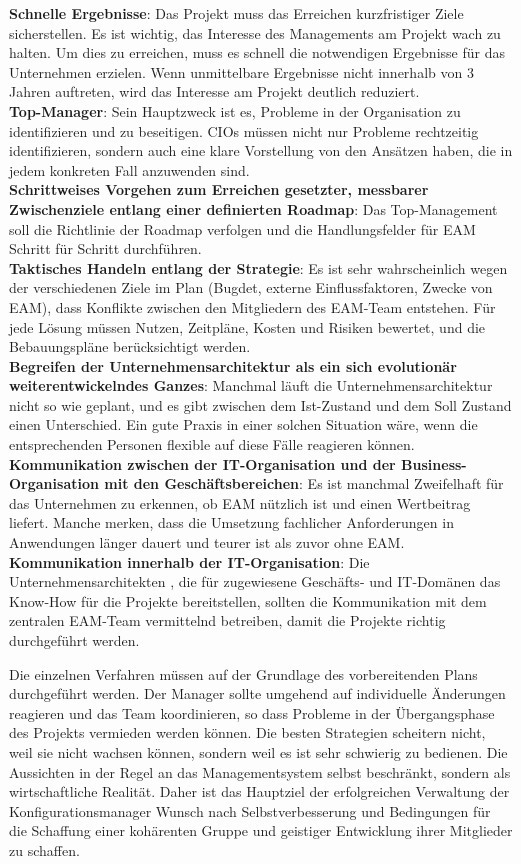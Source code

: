 \documentclass[
	A4paper,
	DIV=9,
	BCOR7mm,
	smallheadings,
	headinclude,
	footinclude,
	headsepline,
	parindent,
	german,
	captions=tableheading,
	abstracton
	]{scrreprt}
\begin{document}
\textbf{Schnelle Ergebnisse}: Das Projekt muss das Erreichen kurzfristiger Ziele sicherstellen. Es ist wichtig, das Interesse des Managements am Projekt wach zu halten. Um dies zu erreichen, muss es schnell die notwendigen Ergebnisse für das Unternehmen erzielen. Wenn unmittelbare Ergebnisse nicht innerhalb von 3 Jahren auftreten, wird das Interesse am Projekt deutlich reduziert.
\\
\textbf{Top-Manager}: Sein Hauptzweck ist es, Probleme in der Organisation zu identifizieren und zu beseitigen. CIOs müssen nicht nur Probleme rechtzeitig identifizieren, sondern auch eine klare Vorstellung von den Ansätzen haben, die in jedem konkreten Fall anzuwenden sind.
\\
\textbf{Schrittweises Vorgehen zum Erreichen gesetzter, messbarer Zwischenziele entlang einer definierten Roadmap}: Das Top-Management soll die Richtlinie der Roadmap verfolgen und die Handlungsfelder für EAM Schritt für Schritt durchführen.
\\
\textbf{Taktisches Handeln entlang der Strategie}: Es ist sehr wahrscheinlich wegen der verschiedenen Ziele im Plan (Bugdet, externe Einflussfaktoren, Zwecke von EAM), dass Konflikte zwischen den Mitgliedern des EAM-Team entstehen. Für jede Lösung müssen Nutzen, Zeitpläne, Kosten und Risiken bewertet, und die Bebauungspläne berücksichtigt werden.
\\
\textbf{Begreifen der Unternehmensarchitektur als ein sich evolutionär weiterentwickelndes  Ganzes}: Manchmal läuft die Unternehmensarchitektur nicht so wie geplant, und es gibt zwischen dem Ist-Zustand und dem Soll Zustand einen Unterschied. Ein gute Praxis in einer solchen Situation wäre, wenn die entsprechenden Personen flexible auf diese Fälle reagieren können.
\\
\textbf{Kommunikation zwischen der IT-Organisation und der Business-Organisation mit den Geschäftsbereichen}: Es ist manchmal Zweifelhaft für das Unternehmen zu erkennen, ob EAM nützlich ist und einen Wertbeitrag liefert. Manche merken, dass die Umsetzung fachlicher Anforderungen in Anwendungen länger dauert und teurer ist als zuvor ohne EAM.
\\
\textbf{Kommunikation innerhalb der IT-Organisation}: Die Unternehmensarchitekten , die für zugewiesene Geschäfts- und IT-Domänen das Know-How für die Projekte bereitstellen, sollten die Kommunikation mit dem zentralen EAM-Team vermittelnd betreiben, damit die Projekte richtig durchgeführt werden.\autocite{Korotkov2013}

Die einzelnen Verfahren müssen auf der Grundlage des vorbereitenden Plans durchgeführt werden. Der Manager sollte umgehend auf individuelle Änderungen reagieren und das Team koordinieren, so dass Probleme in der Übergangsphase des Projekts vermieden werden können. Die besten Strategien scheitern nicht, weil sie nicht wachsen können, sondern weil es ist sehr schwierig zu bedienen. Die Aussichten in der Regel an das Managementsystem selbst beschränkt, sondern als wirtschaftliche Realität. Daher ist das Hauptziel der erfolgreichen Verwaltung der Konfigurationsmanager Wunsch nach Selbstverbesserung und Bedingungen für die Schaffung einer kohärenten Gruppe und geistiger Entwicklung ihrer Mitglieder zu schaffen.
\end{document}
